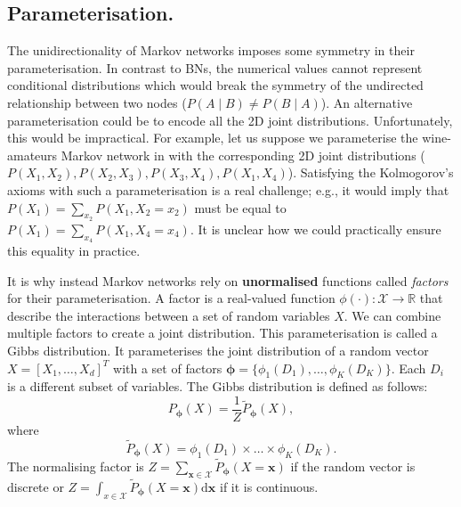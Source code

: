 \subsection{Parameterisation.}
The unidirectionality of Markov networks imposes some symmetry in their parameterisation. In contrast to BNs, the numerical values cannot represent conditional distributions which would break the symmetry of the undirected relationship between two nodes ($P(A \mid B) \neq P(B \mid A)$). An alternative parameterisation could be to encode all the 2D joint distributions. Unfortunately, this would be impractical. For example, let us suppose we parameterise the wine-amateurs Markov network in  with the corresponding 2D joint distributions ($P(X_1, X_2), P(X_2, X_3), P(X_3, X_4), P(X_1, X_4)$). Satisfying the Kolmogorov's axioms with such a parameterisation is a real challenge; e.g., it would imply that $P(X_1) = \sum_{x_2}P(X_1, X_2=x_2)$ must be equal to $P(X_1) = \sum_{x_4}P(X_1, X_4=x_4)$. It is unclear how we could practically ensure this equality in practice.
%



It is why instead Markov networks rely on \textbf{unormalised} functions called \textit{factors} for their parameterisation. A factor is a real-valued function $\phi(\cdot): \mathcal{X} \rightarrow \mathbb{R}$ that describe the interactions between a set of random variables $X$. We can combine multiple factors to create a joint distribution. This parameterisation is called a Gibbs distribution. It parameterises the joint distribution of a random vector $X = \left[X_1, \hdots, X_d\right]^T$ with a set of factors $\bm{\phi} = \{ \phi_1(D_1), \dots, \phi_K(D_K) \}$. Each $D_i$ is a different subset of variables. The Gibbs distribution is defined as follows:
$$P_{\bm{\phi}}(X) = \frac{1}{Z}\tilde{P}_{\bm{\phi}}(X),$$
where
$$ \tilde{P}_{\bm{\phi}}(X) = \phi_1(D_1) \times \dots \times \phi_K(D_K). $$
The normalising factor is $Z=\sum_{\bm{x} \in \mathcal{X}}\tilde{P}_{\bm{\phi}}(X=\bm{x})$ if the random vector is discrete or $Z=\int_{x \in \mathcal{X}}\tilde{P}_{\bm{\phi}}(X=\bm{x})\text{d}\bm{x}$ if it is continuous.

